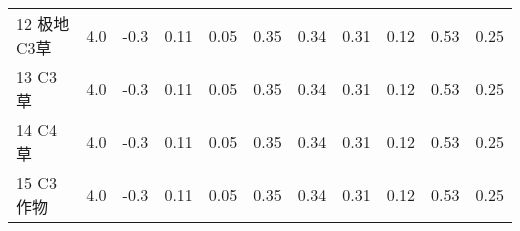\begin{sidewaystable}[]
\begin{tabular}{@{}lcccccccccc@{}}
% 
%
            12 极地C3草 & 4.0 & -0.3 & 0.11 & 0.05 & 0.35 & 0.34 & 0.31 & 0.12 & 0.53 & 0.25 \\
            13 C3草   & 4.0 & -0.3 & 0.11 & 0.05 & 0.35 & 0.34 & 0.31 & 0.12 & 0.53 & 0.25   \\
            14 C4草   & 4.0 & -0.3 & 0.11 & 0.05 & 0.35 & 0.34 & 0.31 & 0.12 & 0.53 & 0.25   \\
            15 C3作物  & 4.0 & -0.3 & 0.11 & 0.05 & 0.35 & 0.34 & 0.31 & 0.12 & 0.53 & 0.25  \\\bottomrule
        \end{tabular}
    \end{sidewaystable}



